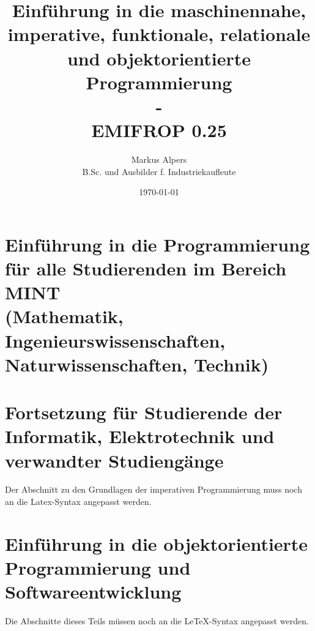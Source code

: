 \documentclass[11pt, a4paper, oneside]{book}
\begin{document}

\title{Einführung in die maschinennahe, imperative, funktionale, relationale und objektorientierte Programmierung\\-\\EMIFROP 0.25}
\author{Markus Alpers\\B.Sc. und Ausbilder f. Industriekaufleute}
\date{\today}

\maketitle


\tableofcontents




\part{Einführung in die Programmierung für alle Studierenden im Bereich MINT\\ \small{(Mathematik, Ingenieurswissenschaften, Naturwissenschaften, Technik)}}






%
%
%
%

\part{Fortsetzung für Studierende der Informatik, Elektrotechnik und verwandter Studiengänge}

%

Der Abschnitt zu den Grundlagen der imperativen Programmierung muss noch an die Latex-Syntax angepasst werden.
%

\part{Einführung in die objektorientierte Programmierung und Softwareentwicklung}

Die Abschnitte dieses Teils müssen noch an die LeTeX-Syntax angepasst werden.
%

%

%

\renewcommand{\indexname}{Stichwortverzeichnis}		%
\printindex
\end{document}
